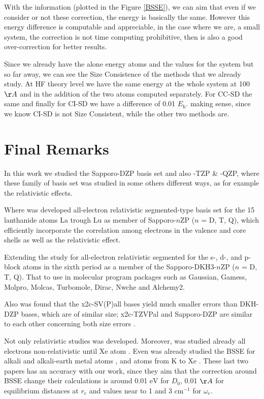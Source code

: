 With the information (plotted in the Figure \ref{BSSE}), we can aim that even if
we consider or not these correction, the energy is basically the same. However
this energy difference is computable and appreciable, in the case where we are,
a small system, the correction is not time computing prohibitive, then is also
a good over-correction for better results.

Since we already have the alone energy atoms and the values for the system but so
far away, we can see the Size Consistence of the methods that we already study.
At HF theory level we have the same energy at the whole system at 100 $\AA$ and
in the addition of the two atoms computed separately. For CC-SD the same and finally
for CI-SD we have a difference of 0.01 $E\mathrm{_h}$. making sense,
since we know CI-SD is not Size Consistent, while the other two methods are.

\section{\textbf{Final Remarks}}

In this work we studied the Sapporo-DZP basis set and also -TZP \& -QZP, where
these family of basis set was studied in some others different ways, as for
example the relativistic effects.

Where was developed all-electron relativistic segmented-type basis set for
the 15 lanthanide atoms La trough Lu as member of Sapporo-$n$ZP ($n$ =
D, T, Q), which efficiently incorporate the correlation among electrons in the
valence and core shells as well as the relativistic effect.\cite{Sekiya2012}

Extending the study for all-electron relativistic segmented for the s-,
d-, and p-block atoms in the sixth period as a member of the
Sapporo-DKH3-$n$ZP ($n$ = D, T, Q). That to use in molecular program
packages such as Gaussian, Gamess, Molpro, Molcas, Turbomole, Dirac,
Nwche and Alchemy2.\cite{Noro2013}

Also was found that the x2c-SV(P)all bases yield much smaller errors than
DKH-DZP bases, which are of similar size; x2c-TZVPal and Sapporo-DZP are similar
to each other concerning both size errors \cite{Pollak2017}.

Not only relativistic studies was developed. Moreover, was studied already all
electrons non-relativistic until Xe atom \cite{Noro2012}. Even was already
studied the BSSE for alkali and alkali-earth metal atoms \cite{Noro2008}, and
atoms from K to Xe \cite{Noro2009}. These last two papers has an accuracy with
our work, since they aim that the correction around BSSE change their
calculations is around 0.01 $\mathrm{eV}$ for $D_0$, 0.01 $\AA$ for equilibrium
distances at $r_e$ and values near to 1 and 3 $\mathrm{cm}^{-1}$ for
$\omega_e$.


